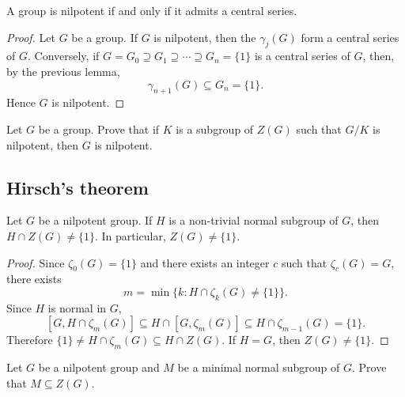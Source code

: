 
\begin{theorem}
A group is nilpotent if and only if it admits a central series. 
\end{theorem}

\begin{proof}
Let $G$ be a group. If $G$ is nilpotent, then the $\gamma_j(G)$ form a central series of 
$G$. Conversely, if $G=G_0\supseteq
G_1\supseteq\cdots\supseteq G_n=\{1\}$ is a central series of $G$, 
then, by the previous lemma,  
	\[
	\gamma_{n+1}(G)\subseteq G_n=\{1\}.
	\]
Hence $G$ is nilpotent. 
\end{proof}

\begin{exercise}
\label{xca:nilpotente_central}
Let $G$ be a group. Prove that if $K$ is a subgroup of $Z(G)$ such that 
$G/K$ is nilpotent, then $G$ is nilpotent. 
\end{exercise}

\subsection{Hirsch's theorem}

\begin{theorem}[Hirsch]
\label{thm:Hirsch}
Let $G$ be a nilpotent group. If $H$ is a non-trivial normal subgroup of $G$, 
then $H\cap Z(G)\ne\{1\}$. In particular, $Z(G)\ne\{1\}$. 
\end{theorem}

\begin{proof}
Since $\zeta_0(G)=\{1\}$ and there exists an integer $c$ such that $\zeta_c(G)=G$, 
there exists 
\[
m=\min\{k:H\cap\zeta_k(G)\ne\{1\}\}.
\]
Since $H$ is normal in $G$, 
\[
[G,H\cap\zeta_m(G)]\subseteq H\cap[G,\zeta_m(G)]\subseteq H\cap\zeta_{m-1}(G)=\{1\}.
\]
Therefore $\{1\}\ne H\cap\zeta_m(G)\subseteq H\cap Z(G)$. If $H=G$, then $Z(G)\ne\{1\}$. 
\end{proof}

\begin{exercise}
\label{xca:nilpotente_minimalnormal}
Let $G$ be a nilpotent group and $M$ be a minimal normal subgroup of $G$. Prove 
that $M\subseteq Z(G)$.
\end{exercise}


